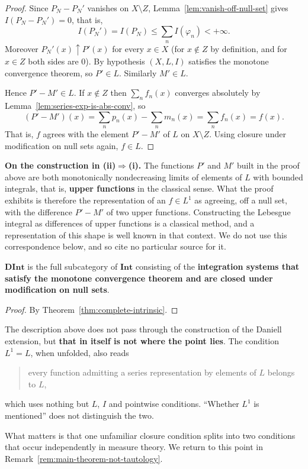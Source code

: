 \begin{proof}
  Since $P_N-P_N'$ vanishes on $X\setminus Z$,
  Lemma~\ref{lem:vanish-off-null-set} gives $I(P_N-P_N')=0$, that is,
  \[
    I(P_N')=I(P_N)\le\sum_nI(\varphi_n)<+\infty .
  \]
  Moreover $P_N'(x)\uparrow P'(x)$ for every $x\in X$ (for $x\notin Z$ by
  definition, and for $x\in Z$ both sides are $0$).
  By hypothesis $(X,L,I)$ satisfies the monotone convergence theorem, so
  $P'\in L$. Similarly $M'\in L$.

  Hence $P'-M'\in L$.
  If $x\notin Z$ then $\sum_nf_n(x)$ converges absolutely by
  Lemma~\ref{lem:series-exp-is-abs-conv}, so
  \[
    (P'-M')(x)=\sum_np_n(x)-\sum_nm_n(x)=\sum_nf_n(x)=f(x) .
  \]
  That is, $f$ agrees with the element $P'-M'$ of $L$ on $X\setminus Z$.
  Using closure under modification on null sets again, $f\in L$.
\end{proof}

\medskip
\noindent
\textbf{On the construction in (ii)$\Rightarrow$(i).}
The functions $P'$ and $M'$ built in the proof above are both monotonically
nondecreasing limits of elements of $L$ with bounded integrals, that is,
\textbf{upper functions} in the classical sense.
What the proof exhibits is therefore the representation of an $f\in L^1$ as
agreeing, off a null set, with the difference $P'-M'$ of two upper functions.
Constructing the Lebesgue integral as differences of upper functions is a
classical method, and a representation of this shape is well known in that
context.
We do not use this correspondence below, and so cite no particular source for
it.

\begin{corollary}\label{cor:mintbar-intrinsic}
  $\mathbf{DInt}$ is the full subcategory of $\mathbf{Int}$ consisting of the
  \textbf{integration systems that satisfy the monotone convergence theorem and
  are closed under modification on null sets}.
\end{corollary}
\begin{proof}
  By Theorem~\ref{thm:complete-intrinsic}.
\end{proof}

\begin{remark}\label{rem:not-about-mentioning-L1}
  The description above does not pass through the construction of the Daniell
  extension, but \textbf{that in itself is not where the point lies}.
  The condition $L^1=L$, when unfolded, also reads
  \begin{quote}
    every function admitting a series representation by elements of $L$ belongs
    to $L$,
  \end{quote}
  which uses nothing but $L$, $I$ and pointwise conditions.
  ``Whether $L^1$ is mentioned'' does not distinguish the two.

  What matters is that one unfamiliar closure condition splits into two
  conditions that occur independently in measure theory.
  We return to this point in
  Remark~\ref{rem:main-theorem-not-tautology}.
\end{remark}

